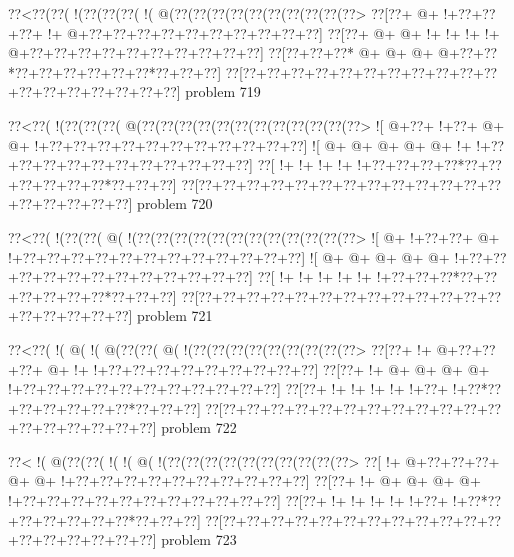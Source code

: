 \vbox{\vbox{\goo
\0??<\0??(\0??(\- !(\0??(\0??(\0??(\- !(\- @(\0??(\0??(\0??(\0??(\0??(\0??(\0??(\0??(\0??(\0??>
\0??[\0??+\- @+\- !+\0??+\0??+\0??+\- !+\- @+\0??+\0??+\0??+\0??+\0??+\0??+\0??+\0??+\0??+\0??]
\0??[\0??+\- @+\- @+\- !+\- !+\- !+\- !+\- @+\0??+\0??+\0??+\0??+\0??+\0??+\0??+\0??+\0??+\0??]
\0??[\0??+\0??+\0??*\- @+\- @+\- @+\- @+\0??+\0??*\0??+\0??+\0??+\0??+\0??+\0??*\0??+\0??+\0??]
\0??[\0??+\0??+\0??+\0??+\0??+\0??+\0??+\0??+\0??+\0??+\0??+\0??+\0??+\0??+\0??+\0??+\0??+\0??]
}
\hfil problem 719\hfil\break
}



\vbox{\vbox{\goo
\0??<\0??(\- !(\0??(\0??(\0??(\- @(\0??(\0??(\0??(\0??(\0??(\0??(\0??(\0??(\0??(\0??(\0??(\0??>
\- ![\- @+\0??+\- !+\0??+\- @+\- @+\- !+\0??+\0??+\0??+\0??+\0??+\0??+\0??+\0??+\0??+\0??+\0??]
\- ![\- @+\- @+\- @+\- @+\- @+\- !+\- !+\0??+\0??+\0??+\0??+\0??+\0??+\0??+\0??+\0??+\0??+\0??]
\0??[\- !+\- !+\- !+\- !+\- !+\0??+\0??+\0??+\0??*\0??+\0??+\0??+\0??+\0??+\0??*\0??+\0??+\0??]
\0??[\0??+\0??+\0??+\0??+\0??+\0??+\0??+\0??+\0??+\0??+\0??+\0??+\0??+\0??+\0??+\0??+\0??+\0??]
}
\hfil problem 720\hfil\break
}



\vbox{\vbox{\goo
\0??<\0??(\- !(\0??(\0??(\- @(\- !(\0??(\0??(\0??(\0??(\0??(\0??(\0??(\0??(\0??(\0??(\0??(\0??>
\- ![\- @+\- !+\0??+\0??+\- @+\- !+\0??+\0??+\0??+\0??+\0??+\0??+\0??+\0??+\0??+\0??+\0??+\0??]
\- ![\- @+\- @+\- @+\- @+\- @+\- !+\0??+\0??+\0??+\0??+\0??+\0??+\0??+\0??+\0??+\0??+\0??+\0??]
\0??[\- !+\- !+\- !+\- !+\- !+\- !+\0??+\0??+\0??*\0??+\0??+\0??+\0??+\0??+\0??*\0??+\0??+\0??]
\0??[\0??+\0??+\0??+\0??+\0??+\0??+\0??+\0??+\0??+\0??+\0??+\0??+\0??+\0??+\0??+\0??+\0??+\0??]
}
\hfil problem 721\hfil\break
}



\vbox{\vbox{\goo
\0??<\0??(\- !(\- @(\- !(\- @(\0??(\0??(\- @(\- !(\0??(\0??(\0??(\0??(\0??(\0??(\0??(\0??(\0??>
\0??[\0??+\- !+\- @+\0??+\0??+\0??+\- @+\- !+\- !+\0??+\0??+\0??+\0??+\0??+\0??+\0??+\0??+\0??]
\0??[\0??+\- !+\- @+\- @+\- @+\- @+\- !+\0??+\0??+\0??+\0??+\0??+\0??+\0??+\0??+\0??+\0??+\0??]
\0??[\0??+\- !+\- !+\- !+\- !+\- !+\0??+\- !+\0??*\0??+\0??+\0??+\0??+\0??+\0??*\0??+\0??+\0??]
\0??[\0??+\0??+\0??+\0??+\0??+\0??+\0??+\0??+\0??+\0??+\0??+\0??+\0??+\0??+\0??+\0??+\0??+\0??]
}
\hfil problem 722\hfil\break
}



\vbox{\vbox{\goo
\0??<\- !(\- @(\0??(\0??(\- !(\- !(\- @(\- !(\0??(\0??(\0??(\0??(\0??(\0??(\0??(\0??(\0??(\0??>
\0??[\- !+\- @+\0??+\0??+\0??+\- @+\- @+\- !+\0??+\0??+\0??+\0??+\0??+\0??+\0??+\0??+\0??+\0??]
\0??[\0??+\- !+\- @+\- @+\- @+\- @+\- !+\0??+\0??+\0??+\0??+\0??+\0??+\0??+\0??+\0??+\0??+\0??]
\0??[\0??+\- !+\- !+\- !+\- !+\- !+\0??+\- !+\0??*\0??+\0??+\0??+\0??+\0??+\0??*\0??+\0??+\0??]
\0??[\0??+\0??+\0??+\0??+\0??+\0??+\0??+\0??+\0??+\0??+\0??+\0??+\0??+\0??+\0??+\0??+\0??+\0??]
}
\hfil problem 723\hfil\break
}



